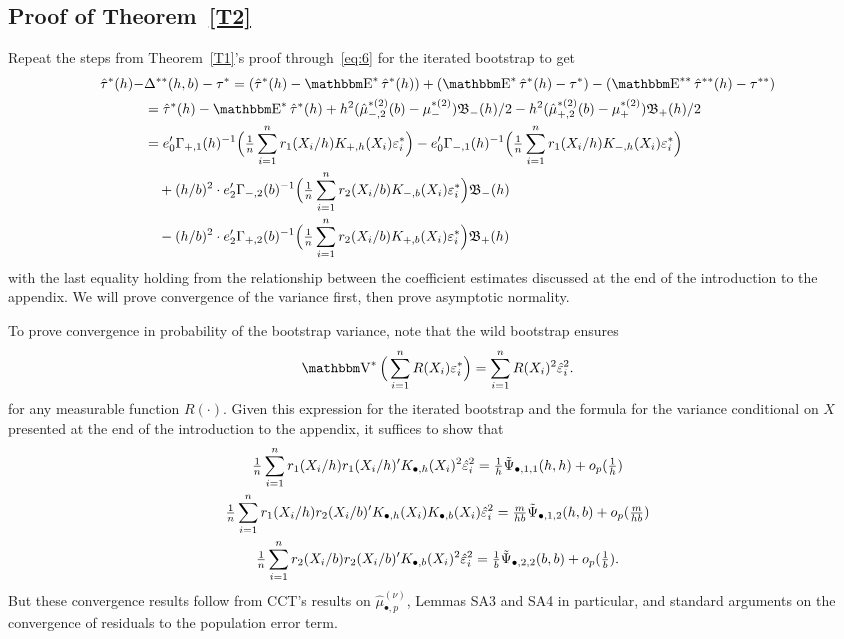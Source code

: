 \documentclass[12pt,fleqn]{article}
\begin{document}
\subsection{Proof of Theorem~\ref{T2}}
Repeat the steps from Theorem~\ref{T1}'s proof through~\eqref{eq:6} for
the iterated bootstrap to get
\begin{align*}
  \hat\tau^{*}(h) - &\Delta^{**}(h,b) - \tau^*
  = (\hat\tau^*(h) - \E^* \hat \tau^*(h)) +
  (\E^* \hat \tau^*(h) - \tau^*) - (\E^{**} \hat \tau^{**}(h) - \tau^{**}) \\
  &= \hat\tau^*(h) - \E^*\hat\tau^*(h)
   + h^2 (\hat\mu_{-,2}^{*(2)}(b) - \mu_-^{*(2)}) \Bf_{-}(h) /2
   - h^2 (\hat\mu_{+,2}^{*(2)}(b) - \mu_+^{*(2)}) \Bf_{+}(h) / 2 \\
  &= e_0' \Gamma_{+,1}(h)^{-1} \Big(\tfrac{1}{n}
  \sum_{i=1}^n r_1(X_i/h) K_{+,h}(X_i) \varepsilon_i^*\Big)
   - e_0' \Gamma_{-,1}(h)^{-1} \Big(\tfrac{1}{n}
  \sum_{i=1}^n r_1(X_i/h) K_{-,h}(X_i) \varepsilon_i^*\Big) \\
  &\quad + (h/b)^2 \cdot e_2' \Gamma_{-,2}(b)^{-1}
    \Big(\tfrac{1}{n} \sum_{i=1}^n r_2(X_i/b) K_{-,b}(X_i) \varepsilon_i^* \Big) \Bf_-(h) \\
  &\quad - (h/b)^2 \cdot e_2' \Gamma_{+,2}(b)^{-1}
    \Big(\tfrac{1}{n} \sum_{i=1}^n r_2(X_i/b) K_{+,b}(X_i) \varepsilon_i^*\Big) \Bf_+(h)
\end{align*}
with the last equality holding from the relationship between the coefficient
estimates discussed at the end of the introduction to the appendix.
We will prove convergence of the variance first, then prove asymptotic
normality.

To prove convergence in probability of the bootstrap variance, note that the
wild bootstrap ensures
\begin{equation*}
  \V^*\Big(\sum_{i=1}^n R(X_i) \varepsilon_i^*\Big)
  = \sum_{i=1}^n R(X_i)^2 \hat\varepsilon_i^2.
\end{equation*}
for any measurable function $R(\cdot)$.
Given this expression for the iterated bootstrap and the formula for the
variance conditional on $X$ presented at the end of the introduction to the
appendix, it suffices to show that
\begin{gather}
  \tfrac{1}{n} \sum_{i=1}^n r_1(X_i/h) r_1(X_i/h)' K_{\bullet,h}(X_i)^2
  \hat\varepsilon_i^2 = \tfrac{1}{h} \tilde{\Psi}_{\bullet,1,1}(h,h) + o_p(\tfrac{1}{h})
  \label{eq:3} \\
  \tfrac{1}{n} \sum_{i=1}^n r_1(X_i/h) r_2(X_i/b)' K_{\bullet,h}(X_i)
  K_{\bullet,b}(X_i) \hat\varepsilon_i^2 = \tfrac{m}{hb} \tilde{\Psi}_{\bullet,1,2}(h,b)
  + o_p(\tfrac{m}{hb})
  \label{eq:5} \\
  \tfrac{1}{n} \sum_{i=1}^n r_2(X_i/b) r_2(X_i/b)' K_{\bullet,b}(X_i)^2
  \hat\varepsilon_i^2 = \tfrac{1}{b} \tilde{\Psi}_{\bullet,2,2}(b,b) + o_p(\tfrac{1}{b}).
  \label{eq:7}
\end{gather}
But these convergence results follow from CCT's results on
$\hat\mu_{\bullet,p}^{(\nu)}$, Lemmas SA3 and SA4 in particular,
and standard arguments on the convergence of residuals to
the population error term.
\end{document}
